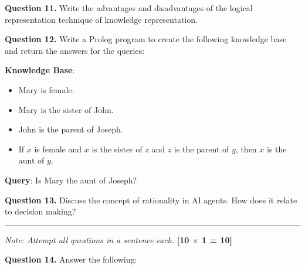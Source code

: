 \documentclass[11pt,a4paper]{article}
\begin{document}
\medskip


\noindent   \textbf{Question 11.} Write the advantages and disadvantages of the logical representation technique of knowledge representation.

\medskip


\noindent   \textbf{Question 12.} Write a Prolog program to create the following knowledge base and return the answers for the queries:

\begin{parts}
  \item   \textbf{Knowledge Base}:
  
\begin{itemize}
    \item Mary is female.
    \item Mary is the sister of John.
    \item John is the parent of Joseph.
    \item If $x$ is female and $x$ is the sister of $z$ and $z$ is the parent of $y$, then $x$ is the aunt of $y$.
  \end{itemize}
  \item   \textbf{Query}: Is Mary the aunt of Joseph?
\end{parts}

\medskip


\noindent   \textbf{Question 13.} Discuss the concept of rationality in AI agents. How does it relate to decision making?

\bigskip


\rule{\linewidth}{0.4pt}\smallskip




\noindent   \textit{Note: Attempt all questions in a sentence each.} \hfill   \textbf{[10 $ \times$ 1 = 10]}

\medskip


\noindent   \textbf{Question 14.} Answer the following:
\end{document}
